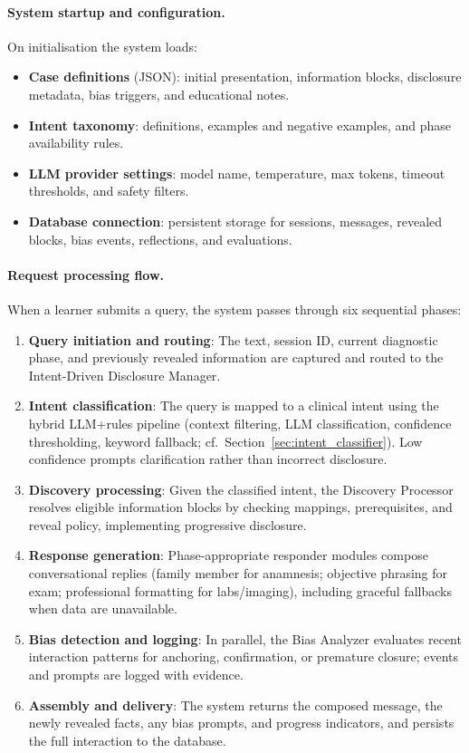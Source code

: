 \paragraph{System startup and configuration.}
On initialisation the system loads:
\begin{itemize}
  \item \textbf{Case definitions} (JSON): initial presentation, information blocks,
        disclosure metadata, bias triggers, and educational notes.
  \item \textbf{Intent taxonomy}: definitions, examples and negative examples,
        and phase availability rules.
  \item \textbf{LLM provider settings}: model name, temperature, max tokens,
        timeout thresholds, and safety filters.
  \item \textbf{Database connection}: persistent storage for sessions, messages,
        revealed blocks, bias events, reflections, and evaluations.
\end{itemize}

\paragraph{Request processing flow.}
When a learner submits a query, the system passes through six sequential phases:

\begin{enumerate}
  \item \textbf{Query initiation and routing}: The text, session ID, current diagnostic
        phase, and previously revealed information are captured and routed to the
        Intent-Driven Disclosure Manager.
  \item \textbf{Intent classification}: The query is mapped to a clinical intent
        using the hybrid LLM+rules pipeline (context filtering, LLM classification,
        confidence thresholding, keyword fallback; cf.\ Section~\ref{sec:intent_classifier}).
        Low confidence prompts clarification rather than incorrect disclosure.
  \item \textbf{Discovery processing}: Given the classified intent, the Discovery
        Processor resolves eligible information blocks by checking mappings,
        prerequisites, and reveal policy, implementing progressive disclosure.
  \item \textbf{Response generation}: Phase-appropriate responder modules compose
        conversational replies (family member for anamnesis; objective phrasing for
        exam; professional formatting for labs/imaging), including graceful fallbacks
        when data are unavailable.
  \item \textbf{Bias detection and logging}: In parallel, the Bias Analyzer evaluates
        recent interaction patterns for anchoring, confirmation, or premature closure;
        events and prompts are logged with evidence.
  \item \textbf{Assembly and delivery}: The system returns the composed message,
        the newly revealed facts, any bias prompts, and progress indicators, and
        persists the full interaction to the database.
\end{enumerate}

